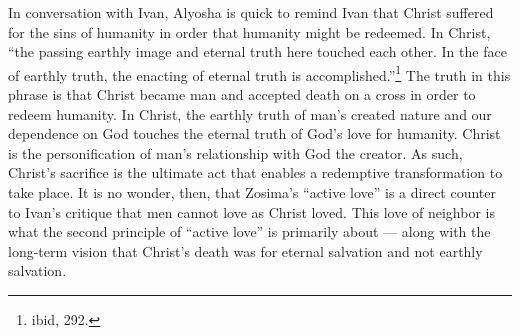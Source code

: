In conversation with Ivan, Alyosha is quick to remind Ivan that Christ suffered for the sins of humanity in order that humanity might be redeemed. In Christ, ``the passing earthly image and eternal truth here touched each other. In the face of earthly truth, the enacting of eternal truth is accomplished.''\footnote{ibid, 292.} The truth in this phrase is that Christ became man and accepted death on a cross in order to redeem humanity. In Christ, the earthly truth of man's created nature and our dependence on God touches the eternal truth of God's love for humanity. Christ is the personification of man's relationship with God the creator. As such, Christ's sacrifice is the ultimate act that enables a redemptive transformation to take place. It is no wonder, then, that Zosima's ``active love'' is a direct counter to Ivan's critique that men cannot love as Christ loved. This love of neighbor is what the second principle of ``active love'' is primarily about --- along with the long-term vision that Christ's death was for eternal salvation and not earthly salvation.

\pagebreak
